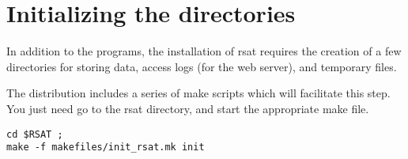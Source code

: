 \documentclass[12pt,a4paper, oneside]{scrreprt} %
\begin{document}

\section{Initializing the directories}

In addition to the programs, the installation of rsat requires
the creation of a few directories for storing data, access logs (for
the web server), and temporary files.

The distribution includes a series of make scripts which will
facilitate this step. You just need go to the rsat directory, and
start the appropriate make file.

\begin{lstlisting}
cd $RSAT ; 
make -f makefiles/init_rsat.mk init
\end{lstlisting}









\end{document}
